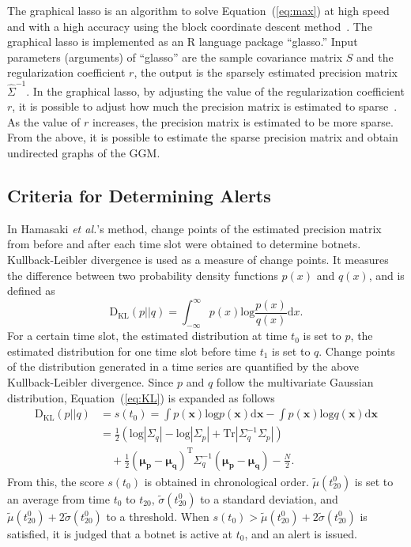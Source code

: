 \documentclass[letterpaper]{sig-alternate-10pt}
\begin{document}
The graphical lasso is an algorithm to solve Equation~(\ref{eq:max}) at high speed and with a high accuracy using the block coordinate descent method~\cite{Banerjee}.
The graphical lasso is implemented as an R language package ``glasso.''
Input parameters (arguments) of ``glasso'' are the sample covariance matrix $S$ and the regularization coefficient $r$, the output is the sparsely estimated precision matrix $\hat{\Sigma}^{-1}$.
In the graphical lasso, by adjusting the value of the regularization coefficient $r$, it is possible to adjust how much the precision matrix is estimated to sparse~\cite{Tibshirani}.
As the value of $r$ increases, the precision matrix is estimated to be more sparse.
From the above, it is possible to estimate the sparse precision matrix and obtain undirected graphs of the GGM.

\subsection{Criteria for Determining Alerts}
In Hamasaki {\it et al.}'s method, change points of the estimated precision matrix from before and after each time slot were obtained to determine botnets.
Kullback-Leibler divergence is used as a measure of change points.
It measures the difference between two probability density functions $p(x)$ and $q(x)$, and is defined as
\begin{equation}
\label{eq:KL}
\mathrm{D_{KL}}(p||q)=\int^{\infty}_{-\infty}{p(x)}\mathrm{log}\frac{p(x)}{q(x)}\mathrm{d}x.
\end{equation}
For a certain time slot, the estimated distribution at time $t_{0}$ is set to $p$, the estimated distribution for one time slot before time $t_{1}$ is set to $q$.
Change points of the distribution generated in a time series are quantified by the above Kullback-Leibler divergence.
Since $p$ and $q$ follow the multivariate Gaussian distribution, Equation~(\ref{eq:KL}) is expanded as follows
\begin{equation*}
\begin{split}
\mathrm{D_{KL}}(p||q) &= s(t_{0}) = \int{p(\bm{x})}\mathrm{log}{p(\bm{x})}\mathrm{d}\bm{x}-\int{p(\bm{x})}\mathrm{log}{q(\bm{x})}\mathrm{d}\bm{x}\\
	&= \frac{1}{2}(\mathrm{log}|\Sigma_{q}|-\mathrm{log}|\Sigma_{p}|+\mathrm{Tr}|\Sigma^{-1}_{q}\Sigma_{p}|)\\
	&\quad+\frac{1}{2}(\bm{\mu_{p}}-\bm{\mu_{q}})^{\mathrm{T}}\Sigma^{-1}_{q}(\bm{\mu_{p}}-\bm{\mu_{q}})-\frac{N}{2}.
\end{split}
\end{equation*}
From this, the score $s(t_{0})$ is obtained in chronological order.
$\tilde{\mu}(t_{20}^{0})$ is set to an average from time $t_{0}$ to $t_{20}$, $\tilde{\sigma}(t_{20}^{0})$ to a standard deviation, and $\tilde{\mu}(t_{20}^{0})+2\tilde{\sigma}(t_{20}^{0})$ to a threshold.
When $s(t_{0})>\tilde{\mu}(t_{20}^{0})+2\tilde{\sigma}(t_{20}^{0})$ is satisfied, it is judged that a botnet is active at $t_{0}$, and an alert is issued.
\end{document}
